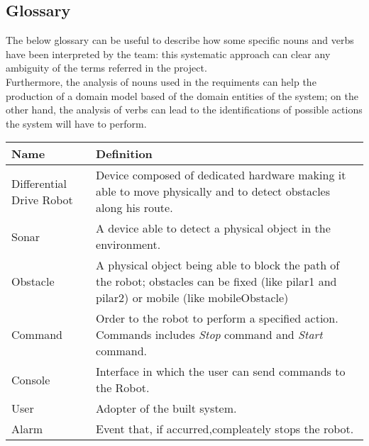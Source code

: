 \documentclass{llncs}
\begin{document}
\subsection{Glossary}
The below glossary can be useful to describe how some specific nouns and verbs have been interpreted by the team: this systematic approach can clear any ambiguity of the terms referred in the project.\\ Furthermore, the analysis of nouns used in the requiments can help the production of a domain model based of the domain entities of the system; on the other hand, the analysis of verbs can lead to the identifications of possible actions the system will have to perform.
\begin{center}
    \begin{tabular}{ | l |  p{8cm} |}
    \hline
    \textbf{Name} & \textbf{Definition} \\ \hline
    Differential Drive Robot & Device composed of dedicated hardware making it able to move physically and to detect obstacles along his route.\\ \hline
    Sonar & A device able to detect a physical object in the environment. \\ \hline
    Obstacle & A physical object being able to block the path of the robot; obstacles can be fixed (like pilar1 and pilar2) or mobile (like mobileObstacle)\\ \hline
    Command & Order to the robot to perform a specified action. Commands includes \textit{Stop} command and \textit{Start} command. \\ \hline %
    Console & Interface in which the user can send commands to the Robot. \\ \hline
    User & Adopter of the built system.\\ \hline
    Alarm & Event that, if accurred,compleately stops the robot.\\ \hline
    \end{tabular}
\end{center}
\end{document}
